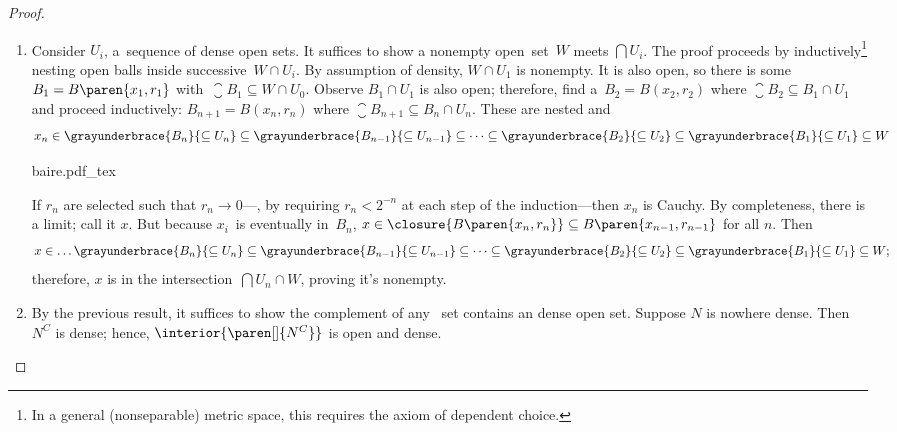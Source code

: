 \documentclass{scrartcl}
\newcommand{\ball}{B}
\begin{document}
\begin{proof} \
  \begin{enumerate}
  \item
    Consider \(U_i\), a~sequence of dense open sets. It suffices to show a nonempty open~set~\(W\)
    meets \(\bigcap U_i\). The proof proceeds by inductively\footnote{In a general (nonseparable) metric space, this requires the axiom of dependent choice.} nesting open balls inside successive~\(W\cap U_i\). By assumption of density, \(W\cap U_1\) is nonempty.
    It is also open, so there is some~\(\ball_1= \ball\paren{x_1,r_1}\) with~\(\closure{\ball_1}\subseteq W\cap U_0\).
    Observe \(\ball_1\cap U_1\) is also open; therefore, find a~\(\ball_2=\ball(x_2,r_2)\) where \(\closure{\ball_2}\subseteq \ball_1\cap U_1\) and proceed inductively: \(\ball_{n+1}=\ball(x_{n},r_{n})\) where \(\closure{\ball_{n+1}}\subseteq \ball_n\cap U_n\). These are nested and
    \[
      x_n \in \grayunderbrace{\ball_n}{\subseteq U_n}\subseteq \grayunderbrace{\ball_{n-1}}{\subseteq U_{n-1}}\subseteq\dots \subseteq
      \grayunderbrace{\ball_2}{\subseteq U_2} \subseteq \grayunderbrace{\ball_1}{\subseteq U_1} \subseteq W
    \]
    \begin{center}
      {baire.pdf_tex}
    \end{center}
    If \(r_n\) are selected such that \(r_n\to 0\)---\eg, by requiring \(r_n < 2^{-n}\) at each step of the induction---then \(x_n\) is Cauchy. By completeness, there is a limit; call it \(x\). But because \(x_i\)~is eventually in~\(\ball_n\), \(x\in \closure{\ball\paren{x_n,r_n}}\subseteq \ball\paren{x_{n-1},r_{n-1}}\) for all \(n\). Then
    \[
      x \in \dots \grayunderbrace{\ball_n}{\subseteq U_n}\subseteq \grayunderbrace{\ball_{n-1}}{\subseteq U_{n-1}}
      \subseteq\dots\subseteq  \grayunderbrace{\ball_2}{\subseteq U_2} \subseteq \grayunderbrace{\ball_1}{\subseteq U_1} \subseteq W;
    \]
    therefore, \(x\) is in the intersection~\(\bigcap U_n\cap W\), proving it's nonempty.
  \item By the previous result, it suffices to show the complement of any ~set contains an dense open set.
    Suppose \(N\) is nowhere dense. Then \(N^C\) is dense; hence, \(\interior{\paren[]{N^C}}\) is open and dense.
  \end{enumerate}
\end{proof}
\end{document}
